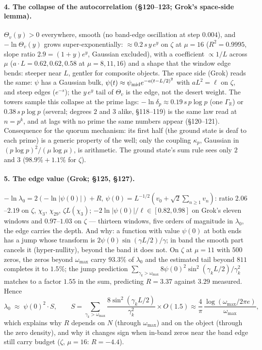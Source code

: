 \documentclass[11pt]{article}
\begin{document}
\paragraph{4. The collapse of the autocorrelation (\S120--123; Grok's space-side lemma).} $\Theta_v(y)>0$ everywhere, smooth (no band-edge oscillation at step $0.004$), and $-\ln\Theta_v(y)$ grows super-exponentially: $\approx0.2\,s\,y\,e^y$ on $\zeta$ at $\mu=16$ ($R^2=0.9995$, slope ratio $2.9=(1+y)e^y$, Gaussian excluded), with a coefficient $\propto1/L$ across $\mu$ ($a\cdot L=0.62,0.62,0.58$ at $\mu=8,11,16$) and a shape that the window edge bends: steeper near $L$, gentler for composite objects. The space side (Grok) reads the same: $\psi$ has a Gaussian bulk, $\psi(t)\approx\psi_{\rm mid}e^{-a(t-L/2)^2}$ with $a L^2=\ell$ on $\zeta$, and steep edges ($e^{-s}$); the $y\,e^y$ tail of $\Theta_v$ is the edge, not the desert weight. The towers sample this collapse at the prime lags: $-\ln\delta_p\approx0.19\,s\,p\log p$ (one $\Gamma_{\mathbb R}$) or $0.38\,s\,p\log p$ (several; degrees $2$ and $3$ alike, \S118--119) is the same law read at $n=p^k$, and at lags with no prime the same numbers appear (\S120--121). Consequence for the quorum mechanism: its first half (the ground state is deaf to each prime) is a generic property of the well; only the coupling $\kappa_p$, Gaussian in $(p\log p)^2/(\mu\log\mu)$, is arithmetic. The ground state's sum rule sees only $2$ and $3$ ($98.9\%+1.1\%$ for $\zeta$).

\paragraph{5. The edge value (Grok; \S125, \S127).} $-\ln\lambda_0=2(-\ln|\psi(0)|)+R$, $\psi(0)=L^{-1/2}(v_0+\sqrt2\sum_{n\ge1}v_n)$: ratio $2.06$--$2.19$ on $\zeta$, $\chi_3$, $\chi_{29}$, $\zeta L(\chi_3)$; $-2\ln|\psi(0)|/\ell\in[0.82,0.98]$ on Grok's eleven windows and $0.97$--$1.03$ on $\zeta$ --- thirteen windows, five orders of magnitude in $\lambda_0$, the edge carries the depth. And why: a function with value $\psi(0)$ at both ends has a jump whose transform is $2\psi(0)\sin(\gamma L/2)/\gamma$; in band the smooth part cancels it (hyper-nullity), beyond the band it does not. On $\zeta$ at $\mu=11$ with $500$ zeros, the zeros beyond $\omega_{\max}$ carry $93.3\%$ of $\lambda_0$ and the estimated tail beyond $811$ completes it to $1.5\%$; the jump prediction $\sum_{\gamma_k>\omega_{\max}}8\psi(0)^2\sin^2(\gamma_kL/2)/\gamma_k^2$ matches to a factor $1.55$ in the sum, predicting $R=3.37$ against $3.29$ measured. Hence
\[
\lambda_0\;\approx\;\psi(0)^2\cdot S,\qquad S=\sum_{\gamma_k>\omega_{\max}}\frac{8\sin^2(\gamma_kL/2)}{\gamma_k^2}\times O(1.5)\approx\frac4\pi\,\frac{\log(\omega_{\max}/2\pi e)}{\omega_{\max}},
\]
which explains why $R$ depends on $N$ (through $\omega_{\max}$) and on the object (through the zero density), and why it changes sign when in-band zeros near the band edge still carry budget ($\zeta$, $\mu=16$: $R=-4.4$).
\end{document}
